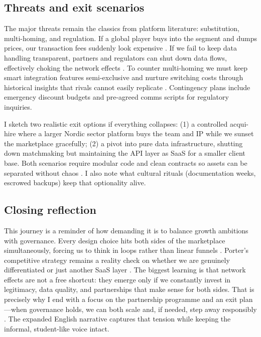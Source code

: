 \subsection*{Threats and exit scenarios}
The major threats remain the classics from platform literature: substitution, multi-homing, and regulation. If a global player buys into the segment and dumps prices, our transaction fees suddenly look expensive \citep{Porter2008}. If we fail to keep data handling transparent, partners and regulators can shut down data flows, effectively choking the network effects \citep{Srnicek2017}. To counter multi-homing we must keep smart integration features semi-exclusive and nurture switching costs through historical insights that rivals cannot easily replicate \citep{FarrellSaloner1986}. Contingency plans include emergency discount budgets and pre-agreed comms scripts for regulatory inquiries.

I sketch two realistic exit options if everything collapses: (1) a controlled acqui-hire where a larger Nordic sector platform buys the team and IP while we sunset the marketplace gracefully; (2) a pivot into pure data infrastructure, shutting down matchmaking but maintaining the API layer as SaaS for a smaller client base. Both scenarios require modular code and clean contracts so assets can be separated without chaos \citep{Reillier2017}. I also note what cultural rituals (documentation weeks, escrowed backups) keep that optionality alive.

\subsection*{Closing reflection}
This journey is a reminder of how demanding it is to balance growth ambitions with governance. Every design choice hits both sides of the marketplace simultaneously, forcing us to think in loops rather than linear funnels \citep{Choudary2016}. Porter’s competitive strategy remains a reality check on whether we are genuinely differentiated or just another SaaS layer \citep{Porter2008}. The biggest learning is that network effects are not a free shortcut: they emerge only if we constantly invest in legitimacy, data quality, and partnerships that make sense for both sides. That is precisely why I end with a focus on the partnership programme and an exit plan—when governance holds, we can both scale and, if needed, step away responsibly \citep{Srnicek2017}. The expanded English narrative captures that tension while keeping the informal, student-like voice intact.

